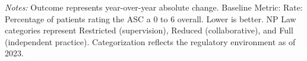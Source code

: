 \begin{table}[htbp]
    \centering
    \caption{Summary of Change in OAS CAHPS: Rating 0 to 6 by Authority and Year}
    \label{tab:d_oas_rating_0_6}
    \vspace{0.2cm}
    \vspace{0.1cm}
    \begin{minipage}{\textwidth}
        \footnotesize \textit{Notes:} Outcome represents year-over-year absolute change. Baseline Metric: Rate: Percentage of patients rating the ASC a 0 to 6 overall. Lower is better. NP Law categories represent Restricted (supervision), Reduced (collaborative), and Full (independent practice). Categorization reflects the regulatory environment as of 2023.
    \end{minipage}
\end{table}